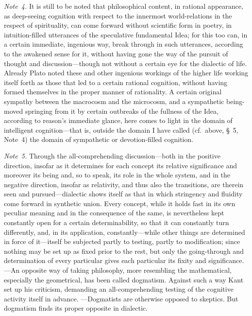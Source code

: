 \documentclass[12pt,a4paper]{book}
\begin{document}
{\small\emph{Note~4.} It is still to be noted that philosophical content, in rational
appearance, as deep-seeing cognition with respect to the innermost world-relations in
the respect of spirituality, can come forward without scientific form in poetry, in
intuition-filled utterances of the speculative fundamental Idea; for this too can, in
a certain immediate, ingenious way, break through in such utterances, according to the
awakened sense for it, without having gone the way of the pursuit of thought and
discussion---though not without a certain eye for the dialectic of life. Already Plato
noted these and other ingenious workings of the higher life working itself forth as
those that led to a certain rational cognition, without having formed themselves in
the proper manner of rationality. A certain original sympathy between the macrocosm
and the microcosm, and a sympathetic being-moved springing from it by certain
outbreaks of the fullness of the Idea, according to reason's immediate glance, here
comes to light in the domain of intelligent cognition---that is, outside the domain I
have called (cf.\ above, \S~5, Note~4) the domain of sympathetic or devotion-filled
cognition.\par}

{\small\emph{Note~5.} Through the all-comprehending discussion---both in the positive
direction, insofar as it determines for each concept its relative significance and
moreover its being and, so to speak, its role in the whole system, and in the negative
direction, insofar as relativity, and thus also the transitions, are therein seen and
pursued---dialectic shows itself as that in which stringency and fluidity come forward
in synthetic union. Every concept, while it holds fast in its own peculiar meaning and
in the consequence of the same, is nevertheless kept constantly open for a certain
determinability, so that it can constantly turn differently, and, in its application,
constantly---while other things are determined in force of it---itself be subjected
partly to testing, partly to modification; since nothing may be set up as fixed prior
to the rest, but only the going-through and determination of every particular gives
each particular its fixity and significance. ---An opposite way of taking philosophy,
more resembling the mathematical, especially the geometrical, has been called
dogmatism. Against such a way Kant set up his criticism, demanding an all-comprehending
testing of the cognitive activity itself in advance. ---Dogmatists are otherwise
opposed to skeptics. But dogmatism finds its proper opposite in dialectic.\par}
\end{document}
